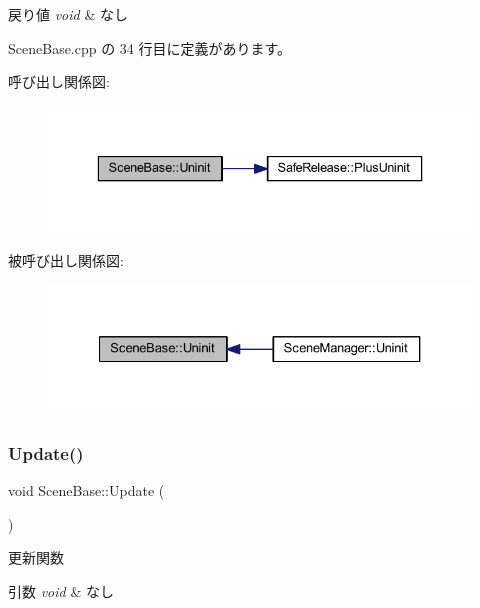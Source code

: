\begin{DoxyRetVals}{戻り値}
{\em void} & なし \\
\hline
\end{DoxyRetVals}


 Scene\+Base.\+cpp の 34 行目に定義があります。

呼び出し関係図\+:
\nopagebreak
\begin{figure}[H]
\begin{center}
\leavevmode
\includegraphics[width=336pt]{class_scene_base_aa4babf42cf2c2b6e17bb3ddd6ff13d31_cgraph}
\end{center}
\end{figure}
被呼び出し関係図\+:
\nopagebreak
\begin{figure}[H]
\begin{center}
\leavevmode
\includegraphics[width=327pt]{class_scene_base_aa4babf42cf2c2b6e17bb3ddd6ff13d31_icgraph}
\end{center}
\end{figure}
\mbox{\label{class_scene_base_a71f332a32d99548b3aa912210a2dd0b0}} 
\subsubsection{\texorpdfstring{Update()}{Update()}}
{\footnotesize\ttfamily void Scene\+Base\+::\+Update (\begin{DoxyParamCaption}{ }\end{DoxyParamCaption})}



更新関数 


\begin{DoxyParams}{引数}
{\em void} & なし \\
\hline
\end{DoxyParams}

